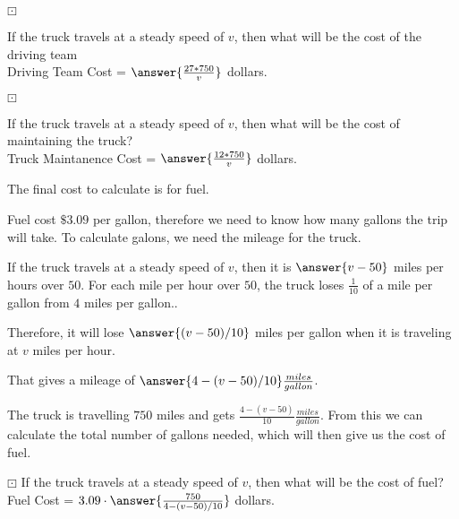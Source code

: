 \documentclass{ximera}
\begin{document}
\begin{question} $\boxdot$

If the truck travels at a steady speed of $v$, then what will be the cost of the driving team \\

Driving Team Cost = $\answer{\frac{27*750}{v}}$ dollars.
\end{question}




\begin{question} $\boxdot$

If the truck travels at a steady speed of $v$, then what will be the cost of maintaining the truck? \\

Truck Maintanence Cost = $\answer{\frac{12*750}{v}}$ dollars.
\end{question}



The final cost to calculate is for fuel.

Fuel cost $\$3.09$ per gallon, therefore we need to know how many gallons the trip will take. To calculate galons, we need the mileage for the truck.


\begin{explanation}

If the truck travels at a steady speed of $v$, then it is $\answer{v-50}$ miles per hours over $50$. For each mile per hour over $50$, the truck loses $\frac{1}{10}$ of a mile per gallon from $4$ miles per gallon..

Therefore, it will lose $\answer{(v-50)/10}$ miles per gallon when it is traveling at $v$ miles per hour.

That gives a mileage of $\answer{4-(v-50)/10} \frac{miles}{gallon}$.

\end{explanation}


The truck is travelling $750$ miles and gets $\frac{4-(v-50)}{10} \frac{miles}{gallon}$. From this we can calculate the total number of gallons needed, which will then give us the cost of fuel.






\begin{question} $\boxdot$
If the truck travels at a steady speed of $v$, then what will be the cost of fuel? \\

Fuel Cost = $ 3.09 \cdot \answer{\frac{750}{4-(v-50)/10}}$ dollars.
\end{question}
\end{document}
